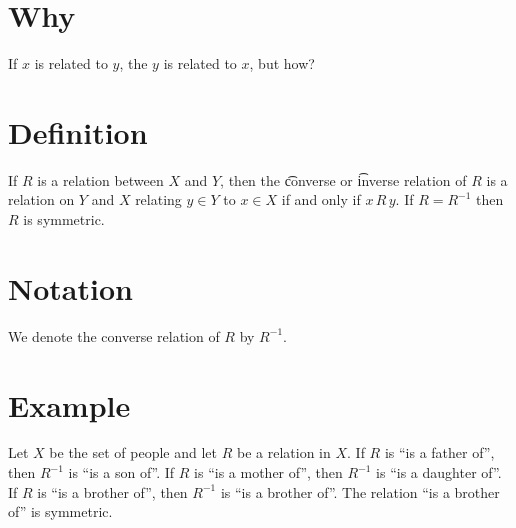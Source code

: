 

\section*{Why}

If $x$ is related to $y$, the $y$ is related to $x$, but how?

\section*{Definition}

If $R$ is a relation between $X$ and $Y$, then the \t{converse} or \t{inverse} relation of $R$ is a relation on $Y$ and $X$ relating $y \in Y$ to $x \in X$ if and only if $x\,R\,y$.
If $R = R^{-1}$ then $R$ is symmetric.

\section*{Notation}

We denote the converse relation of $R$ by $R^{-1}$.

\section*{Example}

Let $X$ be the set of people and let $R$ be a relation in $X$.
If $R$ is ``is a father of'', then $R^{-1}$ is ``is a son of''.
If $R$ is ``is a mother of'', then $R^{-1}$ is ``is a daughter of''.
If $R$ is ``is a brother of'', then $R^{-1}$ is ``is a brother of''.
The relation ``is a brother of'' is symmetric.

\blankpage